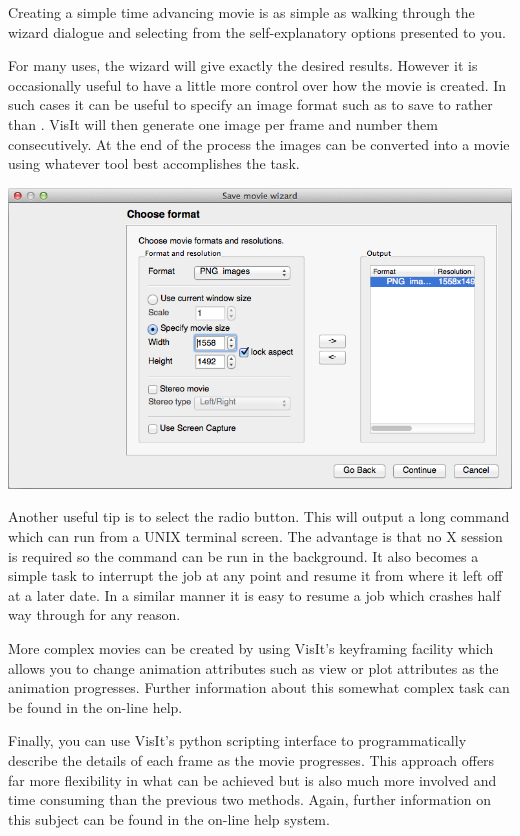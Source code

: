   Creating a simple time advancing movie is as simple as walking through
  the wizard dialogue and selecting from the self-explanatory options
  presented to you.

  For many uses, the wizard will give exactly the desired results. However
  it is occasionally useful to have a little more control over how the
  movie is created. In such cases it can be useful to specify an image
  format such as  to save to rather than . VisIt will
  then generate one image per frame and number them consecutively. At
  the end of the process the images can be converted into a movie using
  whatever tool best accomplishes the task.

  \begin{center}
    \includegraphics[width=0.8\linewidth]{images/visit_movie}
  \end{center}
  Another useful tip is to select the  radio button. This will output a long command which can run from
  a UNIX terminal screen. The advantage is that no X session is required
  so the command can be run in the background. It also becomes a simple
  task to interrupt the job at any point and resume it from where it
  left off at a later date. In a similar manner it is easy to resume
  a job which crashes half way through for any reason.

  More complex movies can be created by using VisIt's keyframing facility
  which allows you to change animation attributes such as view or plot
  attributes as the animation progresses. Further information about this
  somewhat complex task can be found in the on-line help.

  Finally, you can use VisIt's python scripting interface to programmatically
  describe the details of each frame as the movie progresses. This approach
  offers far more flexibility in what can be achieved but is also much
  more involved and time consuming than the previous two methods. Again,
  further information on this subject can be found in the on-line help
  system.

